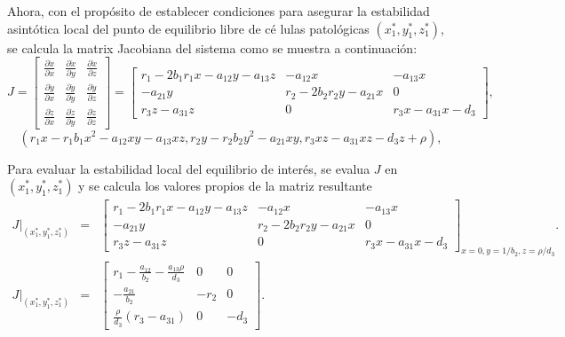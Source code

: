 \documentclass[letterpaper,11pt]{article}
\begin{document}
Ahora, con el prop\'{o}sito de establecer condiciones para asegurar la
estabilidad asint\'{o}tica local del punto de equilibrio libre de c\'{e}%
lulas patol\'{o}gicas $\left( x_{1}^{\ast },y_{1}^{\ast },z_{1}^{\ast
}\right) $, se calcula la matrix Jacobiana del sistema como se muestra a
continuaci\'{o}n:%
\begin{equation*}
J=\left[ 
\begin{array}{ccc}
\frac{\partial \dot{x}}{\partial x} & \frac{\partial \dot{x}}{\partial y} & 
\frac{\partial \dot{x}}{\partial z} \\ 
\frac{\partial \dot{y}}{\partial x} & \frac{\partial \dot{y}}{\partial y} & 
\frac{\partial \dot{y}}{\partial z} \\ 
\frac{\partial \dot{z}}{\partial x} & \frac{\partial \dot{z}}{\partial y} & 
\frac{\partial \dot{z}}{\partial z}%
\end{array}%
\right] =\left[ 
\begin{array}{ccc}
r_{1}-2b_{1}r_{1}x-a_{12}y-a_{13}z & -a_{12}x & -a_{13}x \\ 
-a_{21}y & r_{2}-2b_{2}r_{2}y-a_{21}x & 0 \\ 
r_{3}z-a_{31}z & 0 & r_{3}x-a_{31}x-d_{3}%
\end{array}%
\allowbreak \right] ,
\end{equation*}%
\begin{equation*}
\left(
r_{1}x-r_{1}b_{1}x^{2}-a_{12}xy-a_{13}xz,r_{2}y-r_{2}b_{2}y^{2}-a_{21}xy,r_{3}xz-a_{31}xz-d_{3}z+\rho \right) ,
\end{equation*}

Para evaluar la estabilidad local del equilibrio de inter\'{e}s, se evalua $%
J $ en $\left( x_{1}^{\ast },y_{1}^{\ast },z_{1}^{\ast }\right) $ y se
calcula los valores propios de la matriz resultante%
\begin{eqnarray*}
\left. J\right\vert _{\left( x_{1}^{\ast },y_{1}^{\ast },z_{1}^{\ast
}\right) } &=&\left[ 
\begin{array}{ccc}
r_{1}-2b_{1}r_{1}x-a_{12}y-a_{13}z & -a_{12}x & -a_{13}x \\ 
-a_{21}y & r_{2}-2b_{2}r_{2}y-a_{21}x & 0 \\ 
r_{3}z-a_{31}z & 0 & r_{3}x-a_{31}x-d_{3}%
\end{array}%
\allowbreak \right] _{x=0,y=1/b_{2},z=\rho /d_{3}}. \\
\left. J\right\vert _{\left( x_{1}^{\ast },y_{1}^{\ast },z_{1}^{\ast
}\right) } &=&\left[ 
\begin{array}{ccc}
r_{1}-\frac{a_{12}}{b_{2}}-\frac{a_{13}\rho }{d_{3}} & 0 & 0 \\ 
-\frac{a_{21}}{b_{2}} & -r_{2} & 0 \\ 
\frac{\rho }{d_{3}}\left( r_{3}-a_{31}\right) & 0 & -d_{3}%
\end{array}%
\allowbreak \right] .
\end{eqnarray*}
\end{document}
